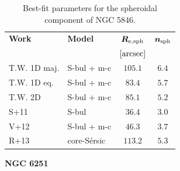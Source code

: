 \documentclass[preprint2]{emulateapj}
\begin{document}
  \begin{table}[h]
  \small
  \caption{Best-fit parameters for the spheroidal component of NGC 5846.}
  \begin{center}
  \begin{tabular}{llcc}
  \hline
  {\bf Work} & {\bf Model}   & $\bm R_{\rm e,sph}$    & $\bm n_{\rm sph}$ \\
    &  &  $[\rm arcsec]$ & \\
  \hline
  T.W. 1D maj. & S-bul + m-c & $105.1$  &  $6.4$ \\
  T.W. 1D eq.  & S-bul + m-c & $83.4$	&  $5.7$ \\
  T.W. 2D      & S-bul + m-c & $85.1$	&  $5.2$ \\
  \hline
  S+11      & S-bul	    & $36.4$   &  $3.0$ \\
  V+12      & S-bul + m-c   & $46.3$   &  $3.7$ \\
  R+13      & core-S\'ersic & $113.2$  &  $5.3$ \\
  \hline
  \end{tabular}
  \end{center}
  \label{tab:n5846}
  \end{table}

  \clearpage\newpage\noindent
  {\bf NGC 6251 \\}
\end{document}
